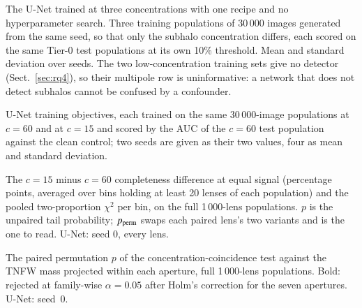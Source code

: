 \documentclass[a4paper,10pt]{article}
\begin{document}
\clearpage

\begin{table}[!htbp]
\caption{The U-Net trained at three concentrations with one recipe and no hyperparameter search. Three training populations of $30\,000$ images generated from the same seed, so that only the subhalo concentration differs, each scored on the same Tier-0 test populations at its own 10\% threshold. Mean and standard deviation over seeds. The two low-concentration training sets give no detector (Sect.~\ref{sec:rq4}), so their multipole row is uninformative: a network that does not detect subhalos cannot be confused by a confounder.}
\label{tab:unet_lowc}
\centering
\scriptsize
\setlength{\tabcolsep}{3pt}

\end{table}

\clearpage

\begin{table}[!htbp]
\caption{U-Net training objectives, each trained on the same 30\,000-image populations at $c=60$ and at $c=15$ and scored by the AUC of the $c=60$ test population against the clean control; two seeds are given as their two values, four as mean and standard deviation.}
\label{tab:unet_obj}
\centering
\scriptsize
\setlength{\tabcolsep}{3pt}

\end{table}

\clearpage

\begin{table}[!htbp]
\caption{The $c=15$ minus $c=60$ completeness difference at equal signal (percentage points, averaged over bins holding at least 20 lenses of each population) and the pooled two-proportion $\chi^2$ per bin, on the full 1\,000-lens populations. $p$ is the unpaired tail probability; $p_{\rm perm}$ swaps each paired lens's two variants and is the one to read. U-Net: seed 0, every lens.}
\label{tab:signal}
\centering
\scriptsize
\setlength{\tabcolsep}{2.5pt}

\end{table}

\clearpage

\begin{table}[!htbp]
\caption{The paired permutation $p$ of the concentration-coincidence test against the TNFW mass projected within each aperture, full 1\,000-lens populations. Bold: rejected at family-wise $\alpha=0.05$ after Holm's correction for the seven apertures. U-Net: seed~0.}
\label{tab:aperture}
\centering
\scriptsize
\setlength{\tabcolsep}{2.5pt}

\end{table}
\end{document}
